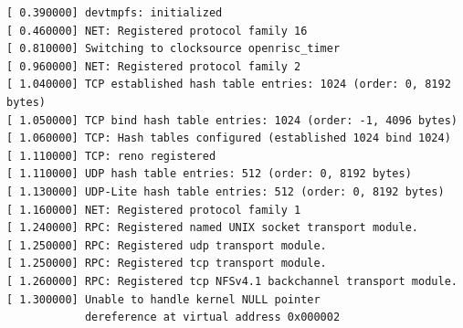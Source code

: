 \begin{lstlisting}[frame=single,caption={Salida de la secuencia de inicio de linux embebido},label={lst:sallinux1}]
[ 0.390000] devtmpfs: initialized 
[ 0.460000] NET: Registered protocol family 16 
[ 0.810000] Switching to clocksource openrisc_timer 
[ 0.960000] NET: Registered protocol family 2 
[ 1.040000] TCP established hash table entries: 1024 (order: 0, 8192 bytes) 
[ 1.050000] TCP bind hash table entries: 1024 (order: -1, 4096 bytes) 
[ 1.060000] TCP: Hash tables configured (established 1024 bind 1024) 
[ 1.110000] TCP: reno registered 
[ 1.110000] UDP hash table entries: 512 (order: 0, 8192 bytes) 
[ 1.130000] UDP-Lite hash table entries: 512 (order: 0, 8192 bytes) 
[ 1.160000] NET: Registered protocol family 1 
[ 1.240000] RPC: Registered named UNIX socket transport module. 
[ 1.250000] RPC: Registered udp transport module. 
[ 1.250000] RPC: Registered tcp transport module. 
[ 1.260000] RPC: Registered tcp NFSv4.1 backchannel transport module. 
[ 1.300000] Unable to handle kernel NULL pointer 
			dereference at virtual address 0x000002 
\end{lstlisting}	
		
